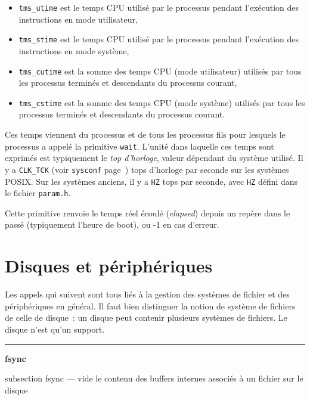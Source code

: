 \documentclass [twoside] {report}
\newcommand {\primitive} [1]
    {
	{\large \bf #1}
	\addcontentsline {toc} {subsection} {#1}
    }
\newcommand {\separation}
    {
	\vspace {7mm}
	\nopagebreak
	\hrule
    }
\begin{document}
\begin {itemize}
    \item {\tt tms\_utime} est le temps CPU utilisé par le processus
	pendant l'exécution des instructions en mode utilisateur,

    \item {\tt tms\_stime} est le temps CPU utilisé par le processus
	pendant l'exécution des instructions en mode système,

    \item {\tt tms\_cutime} est la somme des temps CPU (mode
	utilisateur) utilisés par tous les processus terminés et
	descendants du processus courant,

    \item {\tt tms\_cstime} est la somme des temps CPU (mode système)
	utilisés par tous les processus terminés et descendants du
	processus courant.
\end {itemize}

Ces temps viennent du processus et de tous les processus fils pour
lesquels le processus a appelé la primitive {\tt wait}. L'unité dans
laquelle ces temps sont exprimés est typiquement le {\em top d'horloge},
valeur dépendant du système utilisé.
Il y a {\tt CLK\_TCK} (voir {\tt sysconf} page~\pageref {sysconf}) tops
d'horloge par seconde sur les systèmes POSIX. Sur les systèmes anciens,
il y a {\tt HZ} tops par seconde, avec {\tt HZ} défini dans le fichier
{\tt param.h}.

Cette primitive renvoie le temps réel écoulé ({\it elapsed}) depuis un
repère dans le passé (typiquement l'heure de boot), ou -1 en cas
d'erreur.



\section {Disques et périphériques}


Les appels qui suivent sont tous liés à la
gestion des systèmes de fichier et des périphériques en
général. Il faut bien distinguer la notion de
système de fichiers de celle de disque~: un disque
peut contenir plusieurs systèmes de fichiers. Le
disque n'est qu'un support.




\separation
\primitive {fsync} --- vide le contenu des buffers internes associés à un fichier sur le disque
\end{document}
